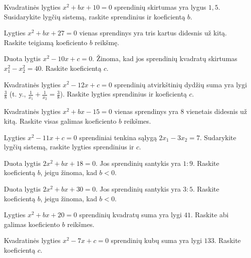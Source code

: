 \documentclass[11pt,a4paper]{scrartcl}
\begin{document}
\begin{problem}
Kvadratinės lygties $x^2 +bx +10 = 0$ sprendinių skirtumas yra lygus $1,5$. Susidarykite lygčių sistemą, raskite sprendinius ir koeficientą $b$.
\end{problem}

\begin{problem}
Lygties $x^2 + bx + 27 = 0$ vienas sprendinys yra tris kartus didesnis už kitą. Raskite teigiamą koeficiento $b$ reikšmę.
\end{problem}

\begin{problem}
Duota lygtis $x^2 - 10x + c = 0$. Žinoma, kad jos sprendinių kvadratų skirtumas $x_1^2 - x_2^2 = 40$. Raskite koeficientą $c$.
\end{problem}

\begin{problem}
Kvadratinės lygties $x^2 - 12x + c = 0$ sprendinių atvirkštinių dydžių suma yra lygi $\frac{3}{8}$ (t. y., $\frac{1}{x_1} + \frac{1}{x_2} = \frac{3}{8}$). Raskite lygties sprendinius ir koeficientą $c$.
\end{problem}

\begin{problem}
Kvadratinės lygties $x^2 + bx - 15 = 0$ vienas sprendinys yra $8$ vienetais didesnis už kitą. Raskite visas galimas koeficiento $b$ reikšmes.
\end{problem}

\begin{problem}
Lygties $x^2 - 11x + c = 0$ sprendiniai tenkina sąlygą $2x_1 - 3x_2 = 7$. Sudarykite lygčių sistemą, raskite lygties sprendinius ir $c$.
\end{problem}

\begin{problem}
Duota lygtis $2x^2 + bx + 18 = 0$. Jos sprendinių santykis yra $1 : 9$. Raskite koeficientą $b$, jeigu žinoma, kad $b < 0$.
\end{problem}

\begin{problem}
Duota lygtis $2x^2 + bx + 30 = 0$. Jos sprendinių santykis yra $3 : 5$. Raskite koeficientą $b$, jeigu žinoma, kad $b < 0$.
\end{problem}

\begin{problem}
Lygties $x^2 + bx + 20 = 0$ sprendinių kvadratų suma yra lygi $41$. Raskite abi galimas koeficiento $b$ reikšmes.
\end{problem}

\begin{problem}
Kvadratinės lygties $x^2 - 7x + c = 0$ sprendinių kubų suma yra lygi $133$. Raskite koeficientą $c$.
\end{problem}
\end{document}
